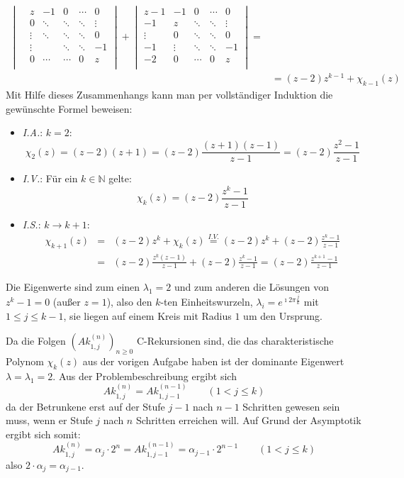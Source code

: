 \begin{flushenum}
\begin{align*}
\begin{vmatrix}
					& z      & -1     & 0      & \cdots & 0      \\
					& 0      & \ddots & \ddots & \ddots & \vdots \\
					& \vdots & \ddots & \ddots & \ddots & 0      \\
					& \vdots &        & \ddots & \ddots & -1     \\
					& 0      & \cdots & \cdots & 0      & z      \\
				\end{vmatrix} +
				\begin{vmatrix}
					z-1    & -1     & 0      & \cdots & 0      \\
					-1     & z      & \ddots & \ddots & \vdots \\
					\vdots & 0      & \ddots & \ddots & 0      \\
					-1     & \vdots & \ddots & \ddots & -1     \\
					-2     & 0      & \cdots & 0      & z      \\
				\end{vmatrix} = \\%
			&= (z-2) z^{k-1} + \chi_{k-1}(z)
	\end{align*}
	Mit Hilfe dieses Zusammenhangs kann man per vollständiger Induktion die gewünschte Formel beweisen:
	\begin{itemize}
		\item \textit{I.A.}: $k=2$: \[ \chi_2(z) = (z-2)(z+1) = (z-2)\frac{(z+1)(z-1)}{z-1} = (z-2)\frac{z^2 - 1}{z-1} \]
		\item \textit{I.V.}: Für ein $k \in \mathbb{N}$ gelte:
			\[ \chi_k(z) = (z-2)\frac{z^k - 1}{z-1} \]
		\item \textit{I.S.}: $k \rightarrow k+1$:
			\begin{eqnarray*}
			\chi_{k+1}(z) &=& (z-2) z^{k} + \chi_k(z) \overset{I.V.}{=} (z-2) z^k + (z-2) \frac{z^k - 1}{z-1} \\
			   &=& (z-2) \frac{z^k (z-1)}{z-1} + (z-2)\frac{z^k - 1}{z-1} =
			   (z-2) \frac{z^{k+1} - 1}{z-1}
			\end{eqnarray*}
	\end{itemize}
	Die Eigenwerte sind zum einen $\lambda_1 = 2$ und zum anderen die Lösungen von $z^k - 1 = 0$ (außer $z = 1$), also den
	$k$-ten Einheitswurzeln, $\lambda_i = e^{\imath 2 \pi \frac{j}{k}}$ mit $1 \leq j \leq k-1$, sie liegen
	auf einem Kreis mit Radius $1$ um den Ursprung.

\item 
Da die Folgen $\left( Ak_{1,j}^{(n)} \right)_{n \geq 0}$ C-Rekursionen sind, die das charakteristische Polynom $\chi_k(z)$
aus der vorigen Aufgabe haben ist der dominante Eigenwert $\lambda = \lambda_1 = 2$.
Aus der Problembeschreibung ergibt sich 
\[ Ak_{1,j}^{(n)} = Ak_{1,j-1}^{(n-1)} \quad \quad (1 < j \leq k) \]
da der Betrunkene erst auf der Stufe $j-1$ nach $n-1$ Schritten gewesen sein muss, wenn er Stufe $j$ nach $n$ Schritten erreichen will.
Auf Grund der Asymptotik ergibt sich somit:
\[ Ak_{1,j}^{(n)} = \alpha_j \cdot 2^n = Ak_{1,j-1}^{(n-1)} = \alpha_{j-1} \cdot 2^{n-1} \quad \quad (1 < j \leq k) \]
also $2 \cdot \alpha_j = \alpha_{j-1}$.


\end{flushenum}
